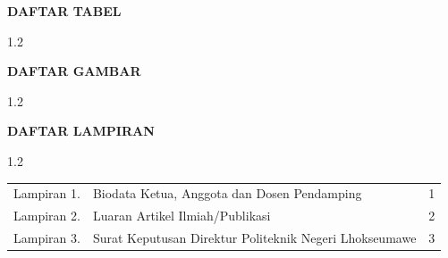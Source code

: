 \documentclass[12pt, a4paper, onecolumn, oneside]{report}
\begin{document}
\newpage
{}
{}
\vspace*{-1cm}
{\centering\fontsize{14pt}{16pt}\selectfont\bfseries DAFTAR TABEL\par}
\vspace{20pt}
\begin{spacing}{1.2}
\makeatletter{}\makeatother
\end{spacing}

\newpage
{}
{}
\vspace*{-1cm}
{\centering\fontsize{14pt}{16pt}\selectfont\bfseries DAFTAR GAMBAR\par}
\vspace{20pt}
\begin{spacing}{1.2}
\makeatletter{}\makeatother
\end{spacing}

\newpage
{}
{}
\vspace*{-1cm}
{\centering\fontsize{14pt}{16pt}\selectfont\bfseries DAFTAR LAMPIRAN\par}
\vspace{20pt}
\begin{spacing}{1.2}
\noindent
\begin{tabular}{@{}p{3.2cm}p{9cm}r@{}}
Lampiran 1. & Biodata Ketua, Anggota dan Dosen Pendamping & 1 \\[4pt]
Lampiran 2. & Luaran Artikel Ilmiah/Publikasi & 2 \\[4pt]
Lampiran 3. & Surat Keputusan Direktur Politeknik Negeri Lhokseumawe & 3 \\
\end{tabular}
\end{spacing}

\newpage
{}
\setcounter{page}{1}
\fancyhf{}
\rhead{\thepage}
\pagestyle{fancy}
\end{document}
